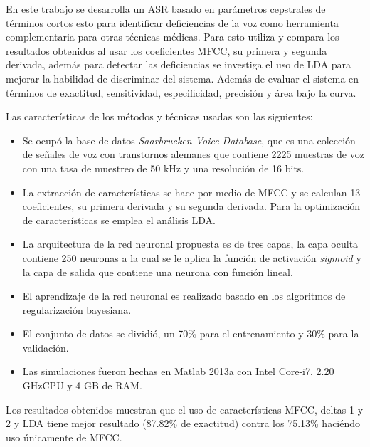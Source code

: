 	En este trabajo se desarrolla un ASR basado en parámetros cepstrales de términos cortos esto para identificar deficiencias de la voz como herramienta complementaria para otras técnicas médicas.
	Para esto utiliza y compara los resultados obtenidos al usar los coeficientes MFCC, su primera y segunda derivada, además para detectar las deficiencias se investiga el uso de LDA para mejorar la habilidad de discriminar del sistema. Además de evaluar el sistema en términos de exactitud, sensitividad, especificidad, precisión y área bajo la curva.
	
	Las características de los métodos y técnicas usadas son las siguientes:
	
	\begin{itemize}
	\item	Se ocupó la base de datos \textit{Saarbrucken Voice Database}, que es una colección de señales de voz con transtornos alemanes que contiene 2225 muestras de voz con una tasa de muestreo de 50 kHz y una resolución de 16 bits.
	\item	La extracción de características se hace por medio de MFCC y se calculan 13 coeficientes, su primera derivada y su segunda derivada. Para la optimización de características se emplea el análisis LDA.
	\item	La arquitectura de la red neuronal propuesta es de tres capas, la capa oculta contiene 250 neuronas a la cual se le aplica la función de activación \textit{sigmoid} y la capa de salida que contiene una neurona con función lineal.
	\item	El aprendizaje de la red neuronal es realizado basado en los algoritmos de regularización bayesiana.
	\item	El conjunto de datos se dividió, un 70\% para el entrenamiento y 30\% para la validación.
	\item	Las simulaciones fueron hechas en Matlab 2013a con Intel Core-i7, 2.20 GHzCPU y 4 GB de RAM.
	\end{itemize}
	
	Los resultados obtenidos muestran que el uso de características MFCC, deltas 1 y 2 y LDA tiene mejor resultado (87.82\% de exactitud) contra los 75.13\% haciéndo uso únicamente de MFCC. 
	
	
